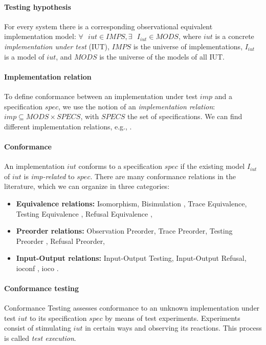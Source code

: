 \paragraph{Testing hypothesis} For every system there is a
corresponding observational equivalent implementation model:
$\forall \text{ } iut \in IMPS, \exists \text{ } I_{iut} \in
MODS$, where $iut$ is a concrete \textit{implementation under
test} (IUT), $IMPS$ is the universe of implementations, $I_{iut}$
is a model of $iut$, and $MODS$ is the universe of the models of
all IUT.

\paragraph{Implementation relation} To define conformance between
an implementation under test $imp$ and a specification $spec$, we
use the notion of an \textit{implementation relation}: $imp
\subseteq MODS \times SPECS$, with $SPECS$ the set of
specifications. We can find different implementation relations,
e.g., \cite{Bri88,phalippou94}.

\paragraph{Conformance} An implementation $iut$ conforms to a
specification $spec$ if the existing model $I_{iut}$ of $iut$ is
\textit{imp-related} to $spec$. There are many conformance
relations in the literature, which we can organize in three
categories:

\begin{itemize}
\item \textbf{Equivalence relations:} Isomorphism, Bisimulation
\cite{Abdulla06,Fernandez89animplementation}, Trace Equivalence,
Testing Equivalence \cite{Abramsky1987225}, Refusal Equivalence
\cite{DBLP:conf/icalp/Phillips86},

\item \textbf{Preorder relations:} Observation Preorder, Trace
Preorder, Testing Preorder \cite{Beohar2015}, Refusal Preorder,

\item \textbf{Input-Output relations:} Input-Output Testing,
Input-Output Refusal, ioconf \cite{tretmans1996conformance}, ioco
\cite{Tre96}.
\end{itemize}

\paragraph{Conformance testing} Conformance Testing assesses
conformance to an unknown implementation under test $iut$ to its
specification $spec$ by means of test experiments. Experiments
consist of stimulating $iut$ in certain ways and observing its
reactions. This process is called \textit{test execution}.

